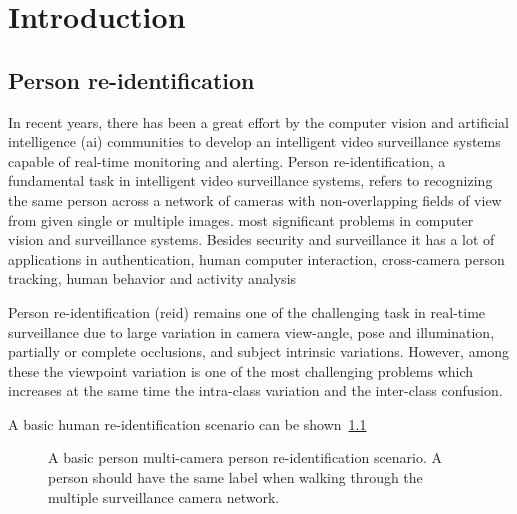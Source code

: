 \chapter{Introduction}\label{intro}
\section{Person re-identification}
In recent years, there has been a great effort by the computer vision and artificial intelligence (\gls{ai}) communities to develop an intelligent video surveillance systems capable of real-time monitoring and alerting. Person re-identification, a fundamental task in intelligent video surveillance systems, refers to recognizing the same person across a network of cameras with non-overlapping fields of view from given single or multiple images. most significant problems in computer vision and surveillance systems. Besides security and surveillance it has a lot of applications in authentication, human computer interaction, cross-camera person tracking, human behavior and activity analysis

Person re-identification (\gls{reid}) remains one of the challenging task in real-time surveillance due to large variation in camera view-angle, pose and illumination, partially or complete occlusions, and subject intrinsic variations. However, among these the viewpoint variation is one of the most challenging problems which increases at the same time the intra-class variation and the inter-class confusion.

A basic human re-identification scenario can be shown~\ref{fig:person_reid}
\begin{figure}
	\caption[A basic person re-identification scenario]
	{A basic person multi-camera person re-identification scenario. A person should have the same label when walking through the multiple surveillance camera network. \label{fig:person_reid}}
\end{figure}


